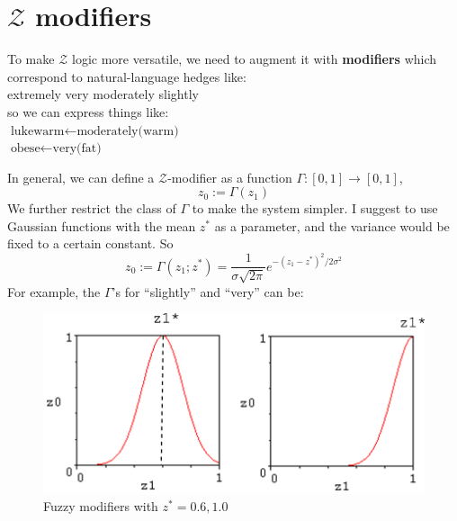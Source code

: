 \section{$\mathcal{Z}$ modifiers}

To make $\mathcal{Z}$ logic more versatile, we need to augment it with \textbf{modifiers} which correspond to natural-language hedges like:\\
\hspace*{1cm} extremely \hspace*{1cm} very \hspace*{1cm} moderately \hspace*{1cm} slightly\\
so we can express things like:\\
\hspace*{1cm} $\mbox{lukewarm} \leftarrow \mbox{moderately(warm)}$\\
\hspace*{1cm} $\mbox{obese} \leftarrow \mbox{very(fat)}$

In general, we can define a $\mathcal{Z}$-modifier as a function $\Gamma: [0,1] \rightarrow [0,1]$,
\begin{equation}
z_0 := \Gamma(z_1)
\end{equation}
We further restrict the class of $\Gamma$ to make the system simpler.  I suggest to use Gaussian functions with the mean $z^*$ as a parameter, and the variance would be fixed to a certain constant.  So
\begin{equation}
z_0 := \Gamma(z_1; z^*) = \frac{1}{\sigma \sqrt{2 \pi}} e^{- (z_1-z^*)^2 / 2 \sigma^2}
\label{eqn:fuzzy-moderator-Gaussian}
\end{equation}
For example, the $\Gamma$'s for ``slightly'' and ``very'' can be:
\begin{figure}[H]
\centering
\includegraphics[scale=0.9]{fuzzy-modifiers.png}
\caption{Fuzzy modifiers with $z^* = 0.6, 1.0$}
\end{figure}

